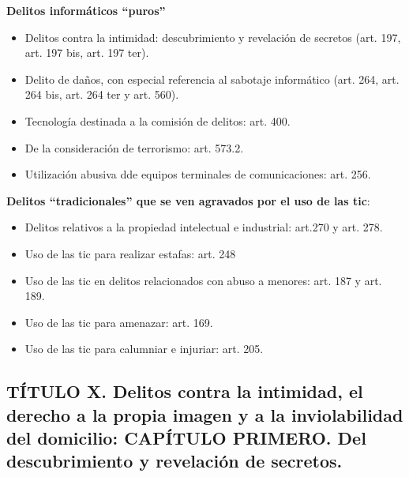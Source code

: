 \textbf{Delitos informáticos ``puros''}
\begin{itemize}
    \item Delitos contra la intimidad: descubrimiento y revelación de secretos (art. 197, art. 197 bis, art. 197 ter).
    \item Delito de daños, con especial referencia al sabotaje informático (art. 264, art. 264 bis, art. 264 ter y art. 560).
    \item Tecnología destinada a la comisión de delitos: art. 400.
    \item De la consideración de terrorismo: art. 573.2.
    \item Utilización abusiva dde equipos terminales de comunicaciones: art. 256.
\end{itemize}

\textbf{Delitos ``tradicionales'' que se ven agravados por el uso de las \gls{tic}}:
\begin{itemize}
    \item Delitos relativos a la propiedad intelectual e industrial: art.270 y art. 278.
    \item Uso de las \gls{tic} para realizar estafas: art. 248
    \item Uso de las \gls{tic} en delitos relacionados con abuso a menores: art. 187 y art. 189.
    \item Uso de las \gls{tic} para amenazar: art. 169.
    \item Uso de las \gls{tic} para calumniar e injuriar: art. 205.
\end{itemize}

\subsection{TÍTULO X. Delitos contra la intimidad, el derecho a la propia imagen y a la inviolabilidad del domicilio: CAPÍTULO PRIMERO. Del descubrimiento y revelación de secretos.}

